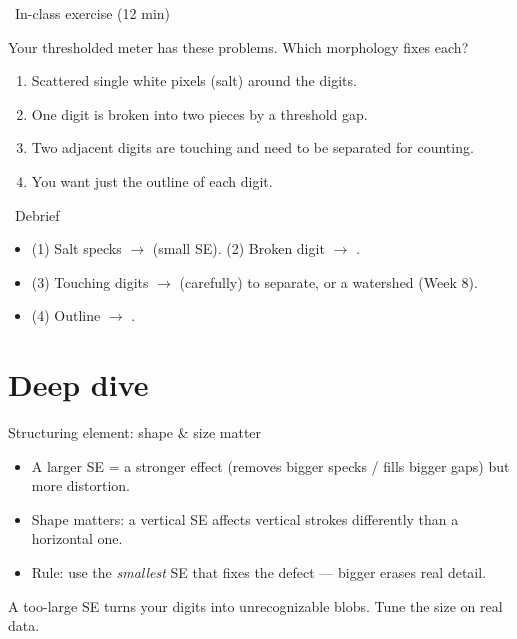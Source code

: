 \documentclass[10pt,aspectratio=169]{beamer}
\begin{document}
\begin{frame}{\faPen~In-class exercise (12 min)}
  \begin{infobox}
  \end{infobox}
  Your thresholded meter has these problems. Which morphology fixes each?
  \begin{enumerate}
    \item Scattered single white pixels (salt) around the digits.
    \item One digit is broken into two pieces by a threshold gap.
    \item Two adjacent digits are touching and need to be separated for counting.
    \item You want just the outline of each digit.
  \end{enumerate}
\end{frame}

\begin{frame}{\faPen~Debrief}
  \begin{itemize}
    \item (1) Salt specks $\rightarrow$  (small SE). (2) Broken digit $\rightarrow$ .
    \item (3) Touching digits $\rightarrow$  (carefully) to separate, or a watershed (Week 8).
    \item (4) Outline $\rightarrow$ .
  \end{itemize}
\end{frame}

\section{Deep dive}

\begin{frame}{Structuring element: shape \& size matter}
  \begin{itemize}
    \item A larger SE = a stronger effect (removes bigger specks / fills bigger gaps) but more distortion.
    \item Shape matters: a vertical SE affects vertical strokes differently than a horizontal one.
    \item Rule: use the \emph{smallest} SE that fixes the defect — bigger erases real detail.
  \end{itemize}
  \begin{badbox}
    A too-large SE turns your digits into unrecognizable blobs. Tune the size on real data.
  \end{badbox}
\end{frame}
\end{document}
